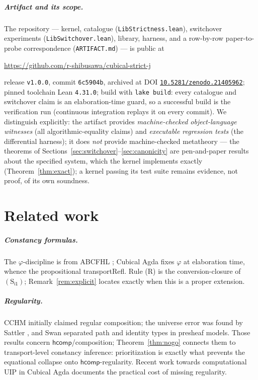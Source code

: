 \documentclass{lmcs}
\newcommand{\hcomp}{\mathsf{hcomp}}
\newcommand{\ii}{\mathsf{i1}}
\begin{document}
\subparagraph*{Artifact and its scope.}  The repository --- kernel,
catalogue (\texttt{LibStrictness.lean}), switchover experiments
(\texttt{LibSwitchover.lean}), library, harness, and a row-by-row
paper-to-probe correspondence (\texttt{ARTIFACT.md}) --- is public at
\begin{center}
  \url{https://github.com/r-shibusawa/cubical-strict-j}
\end{center}
release \texttt{v1.0.0}, commit \texttt{6c5904b}, archived at
DOI \href{https://doi.org/10.5281/zenodo.21405962}%
{\texttt{10.5281/zenodo.21405962}}; pinned toolchain
Lean \texttt{4.31.0}; build with \texttt{lake build}: every catalogue
and switchover claim is an elaboration-time guard, so a successful
build is the verification run (continuous integration replays it on
every commit).  We distinguish explicitly: the artifact provides
\emph{machine-checked object-language witnesses} (all
algorithmic-equality claims) and \emph{executable regression tests}
(the differential harness); it does \emph{not} provide machine-checked
metatheory --- the theorems of
Sections~\ref{sec:switchover}--\ref{sec:canonicity} are pen-and-paper
results about the specified system, which the kernel implements
exactly (Theorem~\ref{thm:exact}); a kernel passing its test suite
remains evidence, not proof, of its own soundness.

\section{Related work}
\label{sec:related}

\subparagraph*{Constancy formulas.}  The $\varphi$-discipline is from
ABCFHL \cite{ABCFHL}; Cubical Agda \cite{VezzosiMortbergAbel} fixes
$\varphi$ at elaboration time, whence the propositional
\textsf{transportRefl}.  Rule (R) is the conversion-closure of
$(\mathrm{S}_{\ii})$; Remark~\ref{rem:explicit} locates exactly when
this is a proper extension.

\subparagraph*{Regularity.}  CCHM \cite{CCHM} initially claimed
regular composition; the universe error was found by Sattler
\cite{SattlerNote}, and Swan \cite{SwanRegularity} separated path and
identity types in presheaf models.  Those results concern
$\hcomp$/composition; Theorem~\ref{thm:nogo} connects them to
transport-level constancy inference: prioritization is exactly what
prevents the equational collapse onto $\hcomp$-regularity.  Recent
work towards computational UIP in Cubical Agda \cite{UIPCubical}
documents the practical cost of missing regularity.
\end{document}
